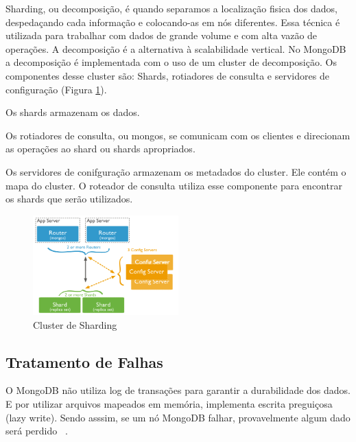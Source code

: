 Sharding, ou decomposição, é quando separamos a localização fisica dos dados, despedaçando cada informação e colocando-as em nós diferentes. Essa técnica é utilizada para trabalhar com dados de grande volume e com alta vazão de operações. A decomposição é a alternativa à scalabilidade vertical. No MongoDB a decomposição é implementada com o uso de um cluster de decomposição. Os componentes desse cluster são: Shards, rotiadores de consulta e servidores de configuração (Figura \ref{fig:sharding}).

Os shards armazenam os dados.

Os rotiadores de consulta, ou mongos, se comunicam com os clientes e direcionam as operações ao shard ou shards apropriados.

Os servidores de conifguração armazenam os metadados do cluster. Ele contém o mapa do cluster. O roteador de consulta utiliza esse componente para encontrar os shards que serão utilizados.

	\begin{figure}[!htbp]
		\begin{center}
			\includegraphics[width=0.5\textwidth]{sharding}
		\end{center}
		\caption{Cluster de Sharding ~\cite{sitemongodb}}
		\label{fig:sharding}
	\end{figure}

\subsection{Tratamento de Falhas}

O MongoDB não utiliza log de transações para garantir a durabilidade dos dados. E por utilizar arquivos mapeados em memória, implementa escrita preguiçosa (lazy write). Sendo asssim, se um nó MongoDB falhar, provavelmente algum dado será perdido ~\cite{Orendanalysisand}.




